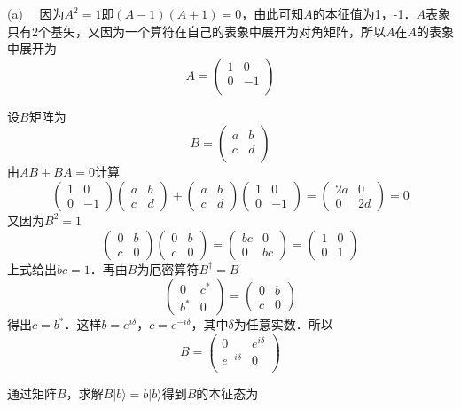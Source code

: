 (a) \ \ 因为$A^2=1$即$(A-1)(A+1)=0$，由此可知$A$的本征值为1，-1．$A$表象只有2个基矢，又因为一个算符在自己的表象中展开为对角矩阵，所以$A$在$A$的表象中展开为
$$
A=\left( \begin{matrix}
	1&		0\\
	0&		-1\\
\end{matrix} \right) 
$$

设$B$矩阵为
$$
B=\left( \begin{matrix}
	a&		b\\
	c&		d\\
\end{matrix} \right) 
$$
由$AB+BA=0$计算
$$
\left(\begin{array}{cc}
1 & 0 \\
0 & -1
\end{array}\right)\left(\begin{array}{ll}
a & b \\
c & d
\end{array}\right)+\left(\begin{array}{ll}
a & b \\
c & d
\end{array}\right)\left(\begin{array}{cc}
1 & 0 \\
0 & -1
\end{array}\right)=\left(\begin{array}{cc}
2 a & 0 \\
0 & 2 d
\end{array}\right)=0
$$
又因为$B^2=1$
$$
\left(\begin{array}{ll}
0 & b \\
c & 0
\end{array}\right)\left(\begin{array}{ll}
0 & b \\
c & 0
\end{array}\right)=\left(\begin{array}{ll}
b c & 0 \\
0 & b c
\end{array}\right)=\left(\begin{array}{ll}
1 & 0 \\
0 & 1
\end{array}\right)$$
上式给出$bc=1$．再由$B$为厄密算符$B^\dagger=B$
$$
\left(\begin{array}{ll}
0 & c^* \\
b^* & 0
\end{array}\right)=\left(\begin{array}{ll}
0 & b \\
c & 0
\end{array}\right)
$$
得出$c=b^*$．这样$b=e^{i\delta}$，$c=e^{-i\delta}$，其中$\delta$为任意实数．所以
$$
B=\left( \begin{matrix}
	0&		e^{i\delta}\\
	e^{-i\delta}&		0\\
\end{matrix} \right) 
$$

通过矩阵$B$，求解$B|b \rangle=b|b \rangle$得到$B$的本征态为